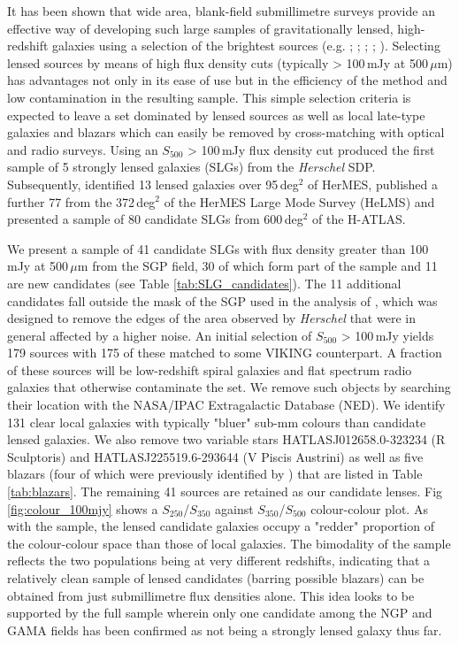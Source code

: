\documentclass[fleqn,usenatbib]{mnras}
\begin{document}
It has been shown that wide area, blank-field submillimetre surveys provide an effective way of developing such large samples of gravitationally lensed, high-redshift galaxies using a selection of the brightest sources (e.g. \citealt{Blain_1996}; \citealt{Perrotta_2002}; \citealt{Negrello_2007}; \citealt{Paciga_2009}; \citealt{Bakx_2020}). Selecting lensed sources by means of high flux density cuts (typically > 100\,mJy at 500\,$\mu$m) has advantages not only in its ease of use but in the efficiency of the method and low contamination in the resulting sample. This simple selection criteria is expected to leave a set dominated by lensed sources as well as local late-type galaxies and blazars which can easily be removed by cross-matching with optical and radio surveys. Using an $S_{500}$ > 100\,mJy flux density cut \citealt{Negrello_2010} produced the first sample of 5 strongly lensed galaxies (SLGs) from the \textit{Herschel} SDP. Subsequently, \citealt{Wardlow_2013} identified 13 lensed galaxies over 95\,deg$^{2}$ of HerMES, \citealt{Nayyeri_2016} published a further 77 from the 372\,deg$^{2}$ of the HerMES Large Mode Survey (HeLMS) and \citealt{Negrello_2017} presented a sample of 80 candidate SLGs from 600\,deg$^{2}$ of the H-ATLAS.

We present a sample of 41 candidate SLGs with flux density greater than 100\,mJy at 500\,$\mu$m from the SGP field, 30 of which form part of the \cite{Negrello_2017} sample and 11 are new candidates (see Table \ref{tab:SLG_candidates}). The 11 additional candidates fall outside the mask of the SGP used in the analysis of \citealt{Negrello_2017}, which was designed to remove the edges of the area observed by \textit{Herschel} that were in general affected by a higher noise. An initial selection of $S_{500}$ > 100\,mJy yields 179 sources with 175 of these matched to some VIKING counterpart. A fraction of these sources will be low-redshift spiral galaxies and flat spectrum radio galaxies that otherwise contaminate the set. We remove such objects by searching their location with the NASA/IPAC Extragalactic Database (NED). We identify 131 clear local galaxies with typically "bluer" sub-mm colours than candidate lensed galaxies. We also remove two variable stars HATLASJ012658.0-323234 (R Sculptoris) and HATLASJ225519.6-293644 (V Piscis Austrini) as well as five blazars (four of which were previously identified by \citealt{Negrello_2017}) that are listed in Table \ref{tab:blazars}. The remaining 41 sources are retained as our candidate lenses. Fig \ref{fig:colour_100mjy} shows a $S_{250}$/$S_{350}$ against $S_{350}$/$S_{500}$ colour-colour plot. As with the \citealt{Negrello_2017} sample, the lensed candidate galaxies occupy a "redder" proportion of the colour-colour space than those of local galaxies. The bimodality of the sample reflects the two populations being at very different redshifts, indicating that a relatively clean sample of lensed candidates (barring possible blazars) can be obtained from just submillimetre flux densities alone. This idea looks to be supported by the full \citealt{Negrello_2017} sample wherein only one candidate among the NGP and GAMA fields has been confirmed as not being a strongly lensed galaxy thus far. 
\end{document}
